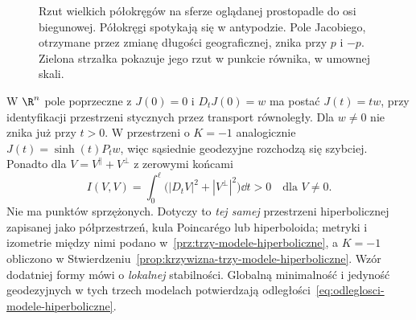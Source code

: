 \begin{figure}[htbp]
\centering
{}
\caption{Rzut wielkich półokręgów na sferze oglądanej prostopadle do osi biegunowej.
Półokręgi spotykają się w antypodzie. Pole Jacobiego, otrzymane przez zmianę
długości geograficznej, znika przy $p$ i $-p$. Zielona strzałka pokazuje jego
rzut w punkcie równika, w umownej skali.}
\label{fig:jacobi-sfera-ogniskowanie}
\end{figure}

\begin{przyklad}
\label{prz:jacobi-plaska-hiperboliczna}
W $\R^n$ pole poprzeczne z $J(0)=0$
i $D_tJ(0)=w$ ma postać $J(t)=tw$,
przy identyfikacji przestrzeni stycznych przez
transport równoległy. Dla $w\ne0$ nie znika już przy $t>0$.
W przestrzeni o $K=-1$ analogicznie
$J(t)=\sinh(t)P_tw$, więc sąsiednie geodezyjne
rozchodzą się szybciej. Ponadto dla
$V=V^\parallel+V^\perp$ z zerowymi końcami
\[
 I(V,V)=\int_0^\ell
        \bigl(|D_tV|^2+|V^\perp|^2\bigr)\dd t>0
 \quad\text{dla }V\ne0.
\]
Nie ma punktów sprzężonych. Dotyczy to
\emph{tej samej} przestrzeni hiperbolicznej
zapisanej jako półprzestrzeń, kula Poincarégo
lub hiperboloida; metryki i izometrie między
nimi podano w~\ref{prz:trzy-modele-hiperboliczne},
a $K=-1$ obliczono w
Stwierdzeniu~\ref{prop:krzywizna-trzy-modele-hiperboliczne}.
Wzór dodatniej formy mówi o \emph{lokalnej}
stabilności. Globalną minimalność i jedyność
geodezyjnych w tych trzech modelach potwierdzają
odległości~\eqref{eq:odleglosci-modele-hiperboliczne}.
\end{przyklad}

